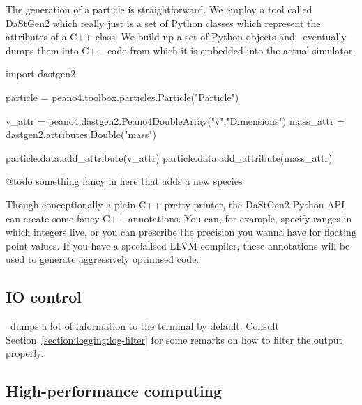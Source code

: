 The generation of a particle is straightforward. We employ a tool called
DaStGen2 which really just is a set of Python classes which represent the 
attributes of a C++ class. We build up a set of Python objects and \Swift\
eventually dumps them into C++ code from which it is embedded into the 
actual simulator.   

\begin{code}
import dastgen2

particle = peano4.toolbox.particles.Particle("Particle")

v_attr = peano4.dastgen2.Peano4DoubleArray("v","Dimensions")
mass_attr = dastgen2.attributes.Double("mass")

particle.data.add_attribute(v_attr)
particle.data.add_attribute(mass_attr)


@todo something fancy in here that adds a new species
\end{code}

\begin{remark}
 Though conceptionally a plain C++ pretty printer, the DaStGen2 Python API
 can create some fancy C++ annotations. You can, for example, specify ranges
 in which integers live, or you can prescribe the precision you wanna have 
 for floating point values. If you have a specialised LLVM compiler, these
 annotations will be used to generate aggressively optimised code.
\end{remark}



\subsection{IO control}

\Peano\ dumps a lot of information to the terminal by default. Consult
Section~\ref{section:logging:log-filter} for some remarks on how to filter the
output properly.




\subsection{High-performance computing}
\label{section:particles:swift:hpc}

